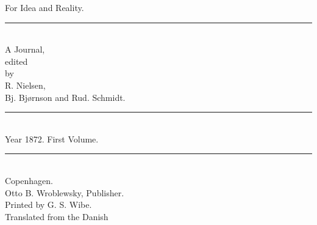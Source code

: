 \documentclass[12pt,a4paper,openany]{book}
\begin{document}
\begin{titlepage}
\begin{center}
\vspace*{3em}
{\Huge For Idea and Reality.}\\[1em]
\rule{8em}{0.4pt}\\[1em]
{\large A Journal,}\\[0.8em]
{\small edited}\\[0.4em]
{\footnotesize by}\\[0.6em]
{\large R. Nielsen,}\\[0.4em]
{\large Bj. Bjørnson and Rud. Schmidt.}\\[1em]
\rule{8em}{0.4pt}\\[0.6em]
{\large Year 1872. First Volume.}\\[0.6em]
\rule{8em}{0.4pt}\\[4em]
Copenhagen.\\[0.4em]
Otto B. Wroblewsky, Publisher.\\[1.5em]
{\small Printed by G. S. Wibe.}\\[3em]
{\small Translated from the Danish}
\end{center}
\end{titlepage}
\end{document}
